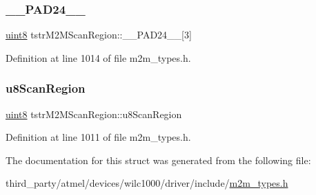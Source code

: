 \subsubsection{\texorpdfstring{\+\_\+\+\_\+\+P\+A\+D24\+\_\+\+\_\+}{\_\_PAD24\_\_}}
{\footnotesize\ttfamily \hyperlink{group__DataT_ga4df709a77647e870bbf1d955b8edc9a6}{uint8} tstr\+M2\+M\+Scan\+Region\+::\+\_\+\+\_\+\+P\+A\+D24\+\_\+\+\_\+\mbox{[}3\mbox{]}}



Definition at line 1014 of file m2m\+\_\+types.\+h.

\mbox{\label{structtstrM2MScanRegion_a0fa84955213be6c6bf2602b743ec315f}} 
\subsubsection{\texorpdfstring{u8\+Scan\+Region}{u8ScanRegion}}
{\footnotesize\ttfamily \hyperlink{group__DataT_ga4df709a77647e870bbf1d955b8edc9a6}{uint8} tstr\+M2\+M\+Scan\+Region\+::u8\+Scan\+Region}



Definition at line 1011 of file m2m\+\_\+types.\+h.



The documentation for this struct was generated from the following file\+:\begin{DoxyCompactItemize}
\item 
third\+\_\+party/atmel/devices/wilc1000/driver/include/\hyperlink{m2m__types_8h}{m2m\+\_\+types.\+h}\end{DoxyCompactItemize}
